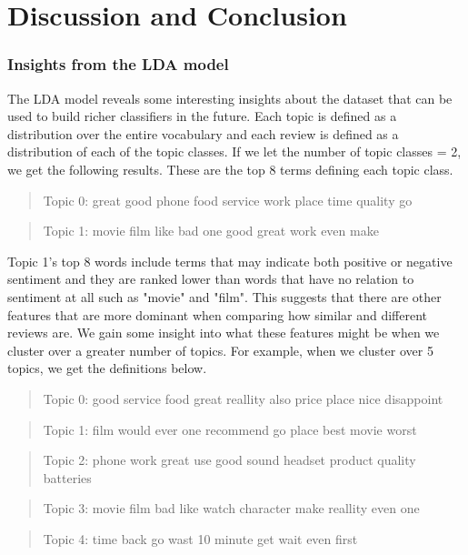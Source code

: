 \documentclass{article} %
\begin{document}
\section{Discussion and Conclusion}
\subsubsection*{Insights from the LDA model }
The LDA model reveals some interesting insights about the dataset that can be used to build richer classifiers in the future. Each topic is defined as a distribution over the entire vocabulary and each review is defined as a distribution of each of the topic classes. If we let the number of topic classes = 2, we get the following results. These are the top 8 terms defining each topic class. 

\begin{quote}
Topic 0: great good phone food service work place time quality go
\end{quote}
\begin{quote}
Topic 1: movie film like bad one good great work even make
\end{quote}

Topic 1's top 8 words include terms that may indicate both positive or negative sentiment and they are ranked lower than words that have no relation to sentiment at all such as "movie" and "film". This suggests that there are other features that are more dominant when comparing how similar and different reviews are. We gain some insight into what these features might be when we cluster over a greater number of topics. For example, when we cluster over 5 topics, we get the definitions below. 

\begin{quote}
Topic 0: good service food great reallity also price place nice disappoint
\end{quote}
\begin{quote}
Topic 1: film would ever one recommend go place best movie worst
\end{quote}
\begin{quote}
Topic 2: phone work great use good sound headset product quality batteries
\end{quote}
\begin{quote}
Topic 3: movie film bad like watch character make reallity even one
\end{quote}
\begin{quote}
Topic 4: time back go wast 10 minute get wait even first
\end{quote}
\end{document}
